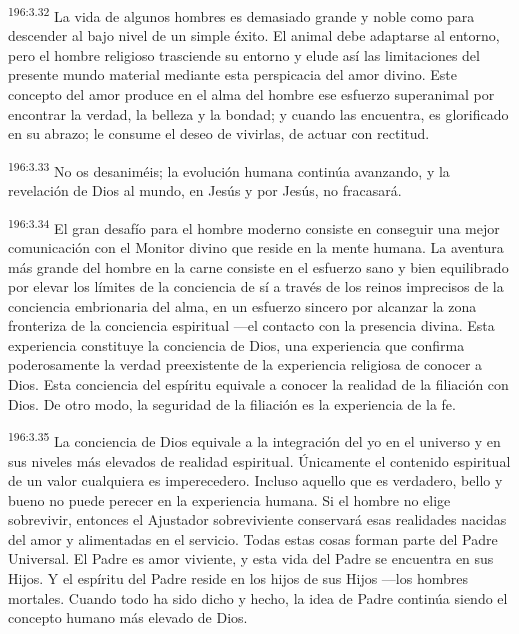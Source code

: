\par 
\textsuperscript{196:3.32} La vida de algunos hombres es demasiado grande y noble como para descender al bajo nivel de un simple éxito. El animal debe adaptarse al entorno, pero el hombre religioso trasciende su entorno y elude así las limitaciones del presente mundo material mediante esta perspicacia del amor divino. Este concepto del amor produce en el alma del hombre ese esfuerzo superanimal por encontrar la verdad, la belleza y la bondad; y cuando las encuentra, es glorificado en su abrazo; le consume el deseo de vivirlas, de actuar con rectitud.

\par 
\textsuperscript{196:3.33} No os desaniméis; la evolución humana continúa avanzando, y la revelación de Dios al mundo, en Jesús y por Jesús, no fracasará.

\par 
\textsuperscript{196:3.34} El gran desafío para el hombre moderno consiste en conseguir una mejor comunicación con el Monitor divino que reside en la mente humana. La aventura más grande del hombre en la carne consiste en el esfuerzo sano y bien equilibrado por elevar los límites de la conciencia de sí a través de los reinos imprecisos de la conciencia embrionaria del alma, en un esfuerzo sincero por alcanzar la zona fronteriza de la conciencia espiritual ---el contacto con la presencia divina. Esta experiencia constituye la conciencia de Dios, una experiencia que confirma poderosamente la verdad preexistente de la experiencia religiosa de conocer a Dios. Esta conciencia del espíritu equivale a conocer la realidad de la filiación con Dios. De otro modo, la seguridad de la filiación es la experiencia de la fe.

\par 
\textsuperscript{196:3.35} La conciencia de Dios equivale a la integración del yo en el universo y en sus niveles más elevados de realidad espiritual. Únicamente el contenido espiritual de un valor cualquiera es imperecedero. Incluso aquello que es verdadero, bello y bueno no puede perecer en la experiencia humana. Si el hombre no elige sobrevivir, entonces el Ajustador sobreviviente conservará esas realidades nacidas del amor y alimentadas en el servicio. Todas estas cosas forman parte del Padre Universal. El Padre es amor viviente, y esta vida del Padre se encuentra en sus Hijos. Y el espíritu del Padre reside en los hijos de sus Hijos ---los hombres mortales. Cuando todo ha sido dicho y hecho, la idea de Padre continúa siendo el concepto humano más elevado de Dios.